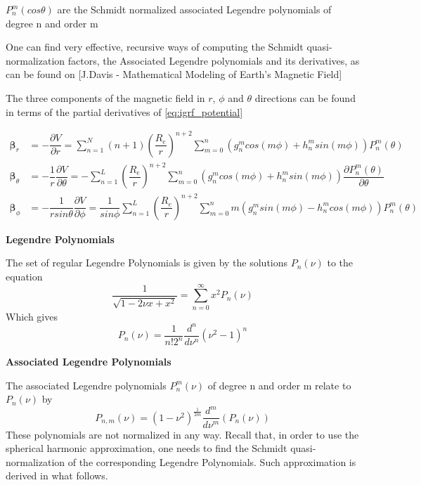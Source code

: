 $P_n^m(cos \theta)$ are the Schmidt normalized associated Legendre polynomials of degree n and order m

One can find very effective, recursive ways of computing the Schmidt quasi-normalization factors, the Associated Legendre polynomials and its derivatives, as can be found on [J.Davis - Mathematical Modeling of Earth’s Magnetic Field] %

The three components of the magnetic field in $r$, $\phi$ and $\theta$ directions can be found in terms of the partial derivatives of \ref{eq:igrf_potential}


\begin{equation} \label{eq:local_sph_cpmt}
\begin{aligned}
{\bm \beta}_r &= -\dfrac{\partial V}{\partial r} = \sum_{n=1}^{N} (n+1) \left(\dfrac{R_e}{r}\right)^{n+2} \sum_{m=0}^{n} \left(g_n^m cos(m\phi) + h_n^m sin(m\phi)\right) P_n^m(\theta)\\
{\bm \beta}_{\theta} &= -\dfrac{1}{r} \dfrac{\partial V}{\partial \theta} = 
-\sum_{n=1}^{L} \left(\dfrac{R_e}{r}\right)^{n+2} \sum_{m=0}^{n} \left(g_n^m cos(m\phi) + h_n^m sin(m\phi)\right) \dfrac{\partial P_n^m(\theta)}{\partial \theta}\\
{\bm \beta}_{\phi} &= -\dfrac{1}{r sin\theta} \dfrac{\partial V}{\partial \phi} = 
\dfrac{1}{sin\phi}\sum_{n=1}^{L} \left(\dfrac{R_e}{r}\right)^{n+2} \sum_{m=0}^{n} m\left(g_n^m sin(m\phi) - h_n^m cos(m\phi)\right) P_n^m(\theta)
\end{aligned}
\end{equation}


{\bf Legendre Polynomials}

The set of regular Legendre Polynomials is given by the solutions $P_n(\nu)$ to the equation
\begin{equation}
\dfrac{1}{\sqrt{1-2\nu x + x^2}} = \sum_{n=0}^\infty x^2 P_n(\nu)
\end{equation}
Which gives
\begin{equation}
P_n(\nu) = \dfrac{1}{n! 2^n} \dfrac{d^n}{d\nu^n} (\nu^2 -1)^n
\end{equation}

{\bf Associated Legendre Polynomials}

The associated Legendre polynomials $P_n^m(\nu)$ of degree n and order m relate to $P_n(\nu)$ by
\begin{equation}
P_{n,m}(\nu) = (1-\nu^2)^{\frac{1}{2m}} \dfrac{d^m}{d\nu^m}(P_n(\nu))
\end{equation}
These polynomials are not normalized in any way. %
Recall that, in order to use the spherical harmonic approximation, one needs to find the Schmidt quasi-normalization of the corresponding Legendre Polynomials. Such approximation is derived in what follows.

